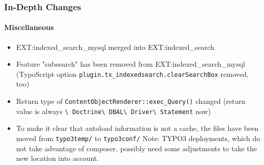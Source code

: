 
\begin{frame}[fragile]
	\frametitle{In-Depth Changes}
	\framesubtitle{Miscellaneous}

	\begin{itemize}

		\item EXT:indexed\_search\_mysql merged into EXT:indexed\_search

		\item Feature "subsearch" has been removed from EXT:indexed\_search\_mysql\newline
			\smaller
				(TypoScript option \texttt{plugin.tx\_indexedsearch.clearSearchBox} removed, too)
			\normalsize

		\item Return type of \texttt{ContentObjectRenderer::exec\_Query()} changed\newline
			\smaller
				(return value is always
					\texttt{\textbackslash
						Doctrine\textbackslash
						DBAL\textbackslash
						Driver\textbackslash
						Statement}
					now)
			\normalsize

		\item To make it clear that autoload information is not a cache, the files
			have been moved from \texttt{typo3temp/} to \texttt{typo3conf/}\newline
			\smaller
				Note: TYPO3 deployments, which do not take advantage of composer, possibly
				need some adjustments to take the new location into account.
			\normalsize

	\end{itemize}

\end{frame}

